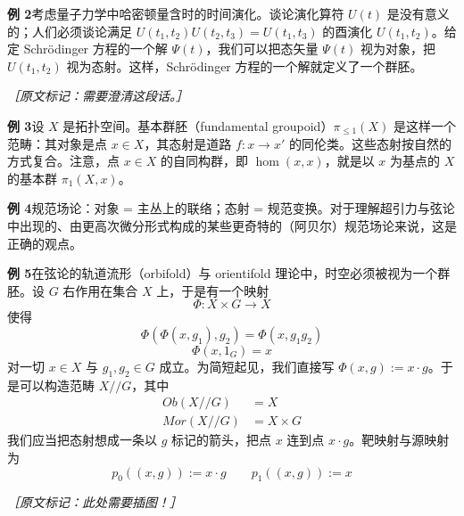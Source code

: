 \textbf{例 2}\quad 考虑量子力学中哈密顿量含时的时间演化。谈论演化算符 $U(t)$ 是没有意义的；人们必须谈论满足 $U(t_1,t_2)U(t_2,t_3)=U(t_1,t_3)$ 的酉演化 $U(t_1,t_2)$。给定 Schrödinger 方程的一个解 $\Psi(t)$，我们可以把态矢量 $\Psi(t)$ 视为对象，把 $U(t_1,t_2)$ 视为态射。这样，Schrödinger 方程的一个解就定义了一个群胚。

{\small\itshape ［原文标记：需要澄清这段话。］}

\textbf{例 3}\quad 设 $X$ 是拓扑空间。基本群胚（fundamental groupoid）$\pi_{\le 1}(X)$ 是这样一个范畴：其对象是点 $x\in X$，其态射是道路 $f:x\to x'$ 的同伦类。这些态射按自然的方式复合。注意，点 $x\in X$ 的自同构群，即 $\hom(x,x)$，就是以 $x$ 为基点的 $X$ 的基本群 $\pi_1(X,x)$。

\textbf{例 4}\quad 规范场论：对象 = 主丛上的联络；态射 = 规范变换。对于理解超引力与弦论中出现的、由更高次微分形式构成的某些更奇特的（阿贝尔）规范场论来说，这是正确的观点。

\textbf{例 5}\quad 在弦论的轨道流形（orbifold）与 orientifold 理论中，时空必须被视为一个群胚。设 $G$ 右作用在集合 $X$ 上，于是有一个映射
\begin{equation}
  \Phi:X\times G\to X
  \tag{K.37}
  \label{eq:K.37}
\end{equation}
使得
\begin{equation}
  \Phi(\Phi(x,g_1),g_2)=\Phi(x,g_1g_2)
  \tag{K.38}
  \label{eq:K.38}
\end{equation}
\begin{equation}
  \Phi(x,1_G)=x
  \tag{K.39}
  \label{eq:K.39}
\end{equation}
对一切 $x\in X$ 与 $g_1,g_2\in G$ 成立。为简短起见，我们直接写 $\Phi(x,g):=x\cdot g$。于是可以构造范畴 $X/\!/G$，其中
\begin{equation}
\begin{split}
  \mathit{Ob}(X/\!/G) &= X\\
  \mathit{Mor}(X/\!/G) &= X\times G
\end{split}
\tag{K.40}
\label{eq:K.40}
\end{equation}
我们应当把态射想成一条以 $g$ 标记的箭头，把点 $x$ 连到点 $x\cdot g$。靶映射与源映射为
\begin{equation}
  p_0((x,g)):=x\cdot g \qquad p_1((x,g)):=x
  \tag{K.41}
  \label{eq:K.41}
\end{equation}

{\small\itshape ［原文标记：此处需要插图！］}

